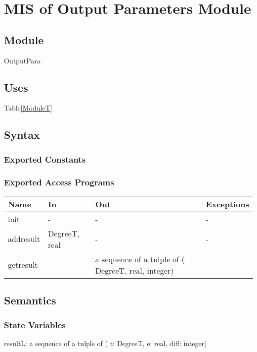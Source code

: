 \documentclass[12pt, titlepage]{article}
\begin{document}
\section{MIS of Output Parameters Module} \label{ModuleOP} 

\subsection{Module}
OutputPara

\subsection{Uses}
Table\ref{ModuleT}\\

\subsection{Syntax}

\subsubsection{Exported Constants}


\subsubsection{Exported Access Programs}

\begin{center}
\begin{tabular}{p{2cm} p{5cm} p{5cm} p{2cm}}
\hline
\textbf{Name} & \textbf{In} & \textbf{Out} & \textbf{Exceptions} \\
\hline 
init & - & - & - \\
addresult &  DegreeT, real & - & - \\
getresult & - & a sequence of a tulple of ( DegreeT, real, integer) & - \\



\hline
\end{tabular}
\end{center}


\subsection{Semantics}

\subsubsection{State Variables}
resultL: a sequence of a tulple  of ( t: DegreeT, e: real, diff: integer)\\
\end{document}
